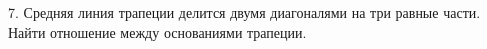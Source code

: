 7. Средняя линия трапеции делится двумя диагоналями на три равные части. Найти отношение между основаниями трапеции.\\
